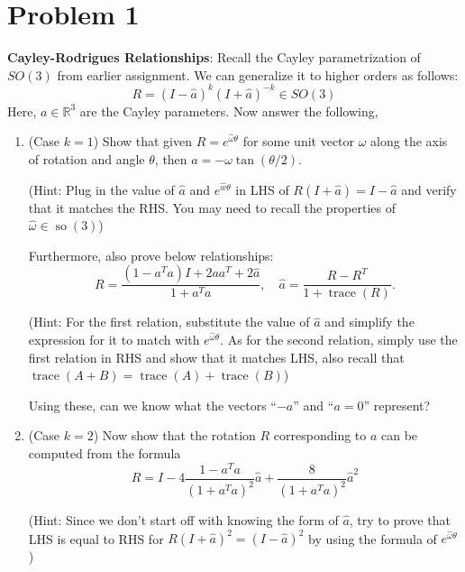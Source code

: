 \section*{Problem 1}
\setcounter{section}{1}
\setcounter{equation}{0}

\textbf{Cayley-Rodrigues Relationships}:
Recall the Cayley parametrization of \( S O(3) \) from earlier assignment.
We can generalize it to higher orders as follows:
\[
    R=(I-\widehat{a})^{k}(I+\widehat{a})^{-k} \in S O(3)
\]
Here, \( a \in \mathbb{R}^{3} \) are the Cayley parameters.
Now answer the following,
\begin{enumerate}[label= (\alph*)]
    \item (Case \( k=1 \))
          Show that given \( R=e^{\widehat{\omega} \theta} \) for some unit vector \( \omega \) along the axis of rotation and angle \( \theta \), then \( a=-\omega \tan (\theta / 2) \).

          (Hint: Plug in the value of \( \widehat{a} \) and \( e^{\widehat{w} \theta} \) in LHS of \( R(I+\widehat{a})=I-\widehat{a} \) and verify that it matches the RHS.\@
          You may need to recall the properties of \( \widehat{\omega} \in \operatorname{so}(3) \))

          Furthermore, also prove below relationships:
          \[
              R=\frac{\left(1-a^{T} a\right) I+2 a a^{T}+2 \widehat{a}}{1+a^{T} a}, \quad \widehat{a}=\frac{R-R^{T}}{1+\operatorname{trace}(R)} .
          \]

          (Hint: For the first relation, substitute the value of \( \widehat{a} \) and simplify the expression for it to match with \( e^{\widehat{\omega} \theta} \).
          As for the second relation, simply use the first relation in RHS and show that it matches LHS, also recall that \( \operatorname{trace}(A+B)=\operatorname{trace}(A)+\operatorname{trace}(B) \))

          Using these, can we know what the vectors ``\( -a \)'' and ``\( a=0 \)'' represent?

    \item (Case \( k=2 \)) Now show that the rotation \( R \) corresponding to \( a \) can be computed from the formula
          \[
              R=I-4 \frac{1-a^{T} a}{\left(1+a^{T} a\right)^{2}} \widehat{a}+\frac{8}{\left(1+a^{T} a\right)^{2}} \widehat{a}^{2}
          \]

          (Hint: Since we don't start off with knowing the form of \( \widehat{a} \), try to prove that LHS is equal to RHS for \( R(I+\widehat{a})^{2}=(I-\widehat{a})^{2} \) by using the formula of \( e^{\widehat{\omega} \theta} \))


\end{enumerate}
